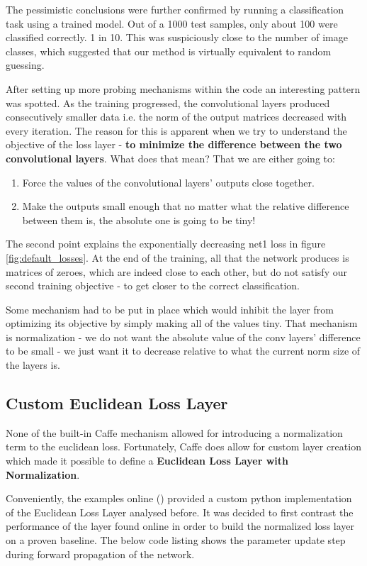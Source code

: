 \documentclass[a4paper, 11pt]{article}
\numberwithin{equation}{section}
\begin{document}
	The pessimistic conclusions were further confirmed by running a classification task using a trained model. Out of a 1000 test samples, only about 100 were classified correctly. 1 in 10. This was suspiciously close to the number of image classes, which suggested that our method is virtually equivalent to random guessing.
	
	After setting up more probing mechanisms within the code an interesting pattern was spotted. As the training progressed, the convolutional layers produced consecutively smaller data i.e. the norm of the output matrices decreased with every iteration. The reason for this is apparent when we try to understand the objective of the loss layer - \textbf{to minimize the difference between the two convolutional layers}. What does that mean? That we are either going to:
	\begin{enumerate}
		\item Force the values of the convolutional layers' outputs close together.
		\item Make the outputs small enough that no matter what the relative difference between them is, the absolute one is going to be tiny!
	\end{enumerate} 
	
	The second point explains the exponentially decreasing net1 loss in figure \ref{fig:default_losses}. At the end of the training, all that the network produces is matrices of zeroes, which are indeed close to each other, but do not satisfy our second training objective - to get closer to the correct classification.
	
	Some mechanism had to be put in place which would inhibit the layer from optimizing its objective by simply making all of the values tiny. That mechanism is normalization - we do not want the absolute value of the conv layers' difference to be small - we just want it to decrease relative to what the current norm size of the layers is.
	
	\subsection{Custom Euclidean Loss Layer}
	
	None of the built-in Caffe mechanism allowed for introducing a normalization term to the euclidean loss. Fortunately, Caffe does allow for custom layer creation which made it possible to define a \textbf{Euclidean Loss Layer with Normalization}.
	
	Conveniently, the examples online (\cite{caffe2016loss}) provided a custom python implementation of the Euclidean Loss Layer analysed before. It was decided to first contrast the performance of the layer found online in order to build the normalized loss layer on a proven baseline. The below code listing shows the parameter update step during forward propagation of the network.\\
	
\end{document}
